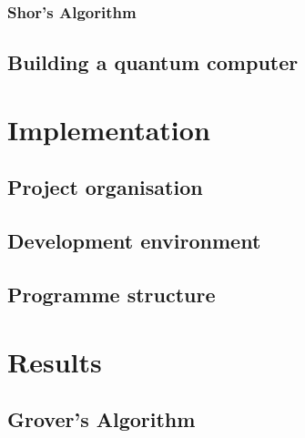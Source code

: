 \documentclass[bibliography=totocnumbered]{article}
\theoremstyle{NoticeStyle}
\begin{document}
\subsubsection{Shor's Algorithm}


\subsection{Building a quantum computer}\label{sec:Building a quantum computer}


%
\section{Implementation}

\subsection{Project organisation}

\subsection{Development environment}

\subsection{Programme structure}


%
\section{Results}


\subsection{Grover's Algorithm}
\end{document}
